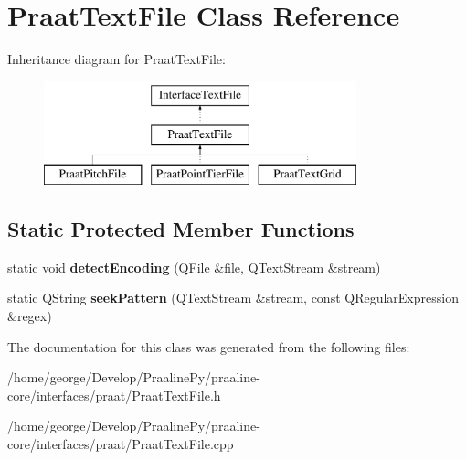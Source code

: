 \hypertarget{class_praat_text_file}{}\section{Praat\+Text\+File Class Reference}
\label{class_praat_text_file}
Inheritance diagram for Praat\+Text\+File\+:\begin{figure}[H]
\begin{center}
\leavevmode
\includegraphics[height=3.000000cm]{class_praat_text_file}
\end{center}
\end{figure}
\subsection*{Static Protected Member Functions}
\begin{DoxyCompactItemize}
\item 
\mbox{\label{class_praat_text_file_a15c5a3683124353c92523fd998d129fc}} 
static void {\bfseries detect\+Encoding} (Q\+File \&file, Q\+Text\+Stream \&stream)
\item 
\mbox{\label{class_praat_text_file_ac5540121130d043c5d966e625ea919f3}} 
static Q\+String {\bfseries seek\+Pattern} (Q\+Text\+Stream \&stream, const Q\+Regular\+Expression \&regex)
\end{DoxyCompactItemize}


The documentation for this class was generated from the following files\+:\begin{DoxyCompactItemize}
\item 
/home/george/\+Develop/\+Praaline\+Py/praaline-\/core/interfaces/praat/Praat\+Text\+File.\+h\item 
/home/george/\+Develop/\+Praaline\+Py/praaline-\/core/interfaces/praat/Praat\+Text\+File.\+cpp\end{DoxyCompactItemize}
